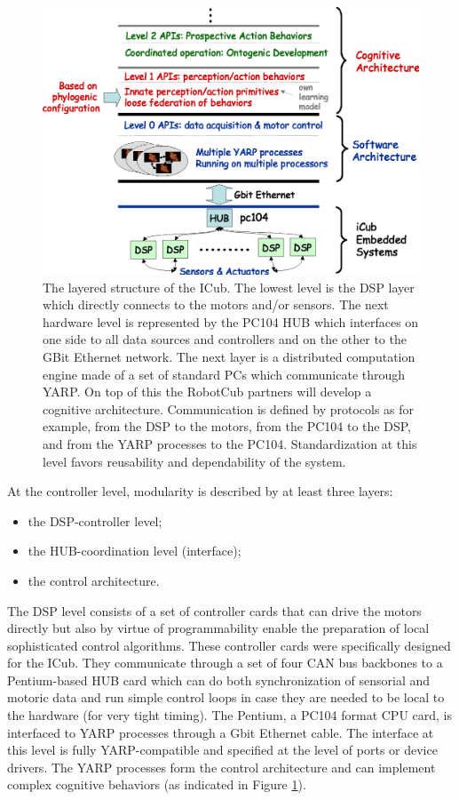 \begin{figure}[tbp]
\centerline{
\includegraphics[width=15cm]{layers}
}
\caption{The layered structure of the ICub. The lowest level is the DSP layer which 
directly connects to the motors and/or sensors. The next hardware level is represented
by the PC104 HUB which interfaces on one side to all data sources and controllers and
on the other to the GBit Ethernet network. The next layer is a distributed computation
engine made of a set of standard PCs which communicate through YARP. On top of this
the RobotCub partners will develop a cognitive architecture. Communication is defined by
protocols as for example, from the DSP to the motors, from the PC104 to the DSP, and from
the YARP processes to the PC104. Standardization at this level favors reusability and
dependability of the system.} 
\label{fig:layers}
\end{figure}

At the controller level, modularity is described by at least three layers:
\begin{itemize}
	\item the DSP-controller level;
	\item the HUB-coordination level (interface);
	\item the control architecture.
\end{itemize}
The DSP level consists of a set of controller cards that can drive the motors
directly but also by virtue of programmability enable the preparation of local
sophisticated control algorithms. These controller cards were specifically 
designed for the ICub. They communicate through a set of four CAN bus backbones
to a Pentium-based HUB card which can do both synchronization of sensorial and
motoric data and run simple control loops in case they are needed to be local 
to the hardware (for very tight timing). The Pentium, a PC104 format CPU card, is 
interfaced to YARP processes through a Gbit Ethernet cable.
The interface at this level is fully YARP-compatible and specified at the level
of ports or device drivers. The YARP processes form the control architecture 
and can implement complex cognitive behaviors (as indicated in Figure \ref{fig:layers}).

